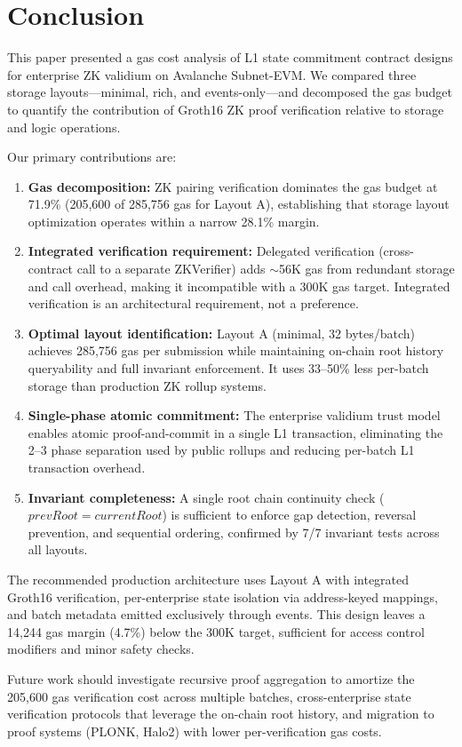 \section{Conclusion}
\label{sec:conclusion}

This paper presented a gas cost analysis of L1 state commitment contract designs for
enterprise ZK validium on Avalanche Subnet-EVM. We compared three storage layouts---minimal,
rich, and events-only---and decomposed the gas budget to quantify the contribution of
Groth16 ZK proof verification relative to storage and logic operations.

Our primary contributions are:

\begin{enumerate}
\item \textbf{Gas decomposition:} ZK pairing verification dominates the gas budget at
71.9\% (205,600 of 285,756 gas for Layout A), establishing that storage layout optimization
operates within a narrow 28.1\% margin.

\item \textbf{Integrated verification requirement:} Delegated verification (cross-contract
call to a separate ZKVerifier) adds $\sim$56K gas from redundant storage and call overhead,
making it incompatible with a 300K gas target. Integrated verification is an architectural
requirement, not a preference.

\item \textbf{Optimal layout identification:} Layout A (minimal, 32 bytes/batch) achieves
285,756 gas per submission while maintaining on-chain root history queryability and full
invariant enforcement. It uses 33--50\% less per-batch storage than production ZK rollup
systems.

\item \textbf{Single-phase atomic commitment:} The enterprise validium trust model enables
atomic proof-and-commit in a single L1 transaction, eliminating the 2--3 phase separation
used by public rollups and reducing per-batch L1 transaction overhead.

\item \textbf{Invariant completeness:} A single root chain continuity check
($\mathit{prevRoot} = \mathit{currentRoot}$) is sufficient to enforce gap detection,
reversal prevention, and sequential ordering, confirmed by 7/7 invariant tests across
all layouts.
\end{enumerate}

The recommended production architecture uses Layout A with integrated Groth16 verification,
per-enterprise state isolation via address-keyed mappings, and batch metadata emitted
exclusively through events. This design leaves a 14,244 gas margin (4.7\%) below the
300K target, sufficient for access control modifiers and minor safety checks.

Future work should investigate recursive proof aggregation to amortize the 205,600 gas
verification cost across multiple batches, cross-enterprise state verification protocols
that leverage the on-chain root history, and migration to proof systems (PLONK, Halo2) with
lower per-verification gas costs.
